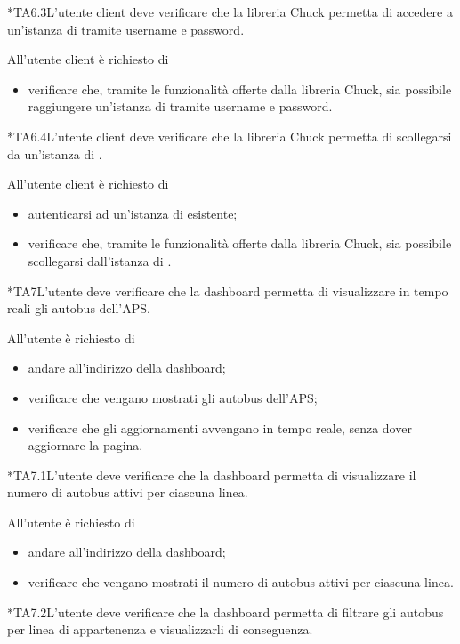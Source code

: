 	*{TA6.3}L'utente client deve verificare che la libreria Chuck permetta di accedere a un'istanza di \projectname{} tramite username e password.
		
		All'utente client è richiesto di
		\begin{itemize}
			\item verificare che, tramite le funzionalità offerte dalla libreria Chuck, sia possibile raggiungere un'istanza di \projectname{} tramite username e password.
		\end{itemize}

	*{TA6.4}L'utente client deve verificare che la libreria Chuck permetta di scollegarsi da un'istanza di \projectname{}.

		All'utente client è richiesto di
		\begin{itemize}
			\item autenticarsi ad un'istanza di \projectname{} esistente;
			\item verificare che, tramite le funzionalità offerte dalla libreria Chuck, sia possibile scollegarsi dall'istanza di \projectname{}.
		\end{itemize}

	*{TA7}L'utente deve verificare che la dashboard permetta di visualizzare in tempo reali gli autobus dell'APS.

		All'utente è richiesto di
		\begin{itemize}
			\item andare all'indirizzo della dashboard;
			\item verificare che vengano mostrati gli autobus dell'APS;
			\item verificare che gli aggiornamenti avvengano in tempo reale, senza dover aggiornare la pagina.
		\end{itemize}

	*{TA7.1}L'utente deve verificare che la dashboard permetta di visualizzare il numero di autobus attivi per ciascuna linea.

		All'utente è richiesto di
		\begin{itemize}
			\item andare all'indirizzo della dashboard;
			\item verificare che vengano mostrati il numero di autobus attivi per ciascuna linea.
		\end{itemize}

	*{TA7.2}L'utente deve verificare che la dashboard permetta di filtrare gli autobus per linea di appartenenza e visualizzarli di conseguenza.

